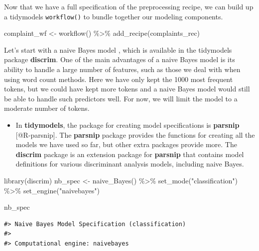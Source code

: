 \documentclass[
]{krantz}
\makeatletter
\newenvironment{Shaded}{\begin{snugshade}}{\end{snugshade}}
\newcommand{\FunctionTok}[1]{\textcolor[rgb]{0.00,0.00,0.00}{#1}}
\newcommand{\NormalTok}[1]{#1}
\newcommand{\OtherTok}[1]{\textcolor[rgb]{0.56,0.35,0.01}{#1}}
\newcommand{\SpecialCharTok}[1]{\textcolor[rgb]{0.00,0.00,0.00}{#1}}
\newcommand{\StringTok}[1]{\textcolor[rgb]{0.31,0.60,0.02}{#1}}
\newenvironment{kframe}{%
\medskip{}
\setlength{\fboxsep}{.8em}
 \def\at@end@of@kframe{}%
 \ifinner\ifhmode%
  \def\at@end@of@kframe{\end{minipage}}%
  \begin{minipage}{\columnwidth}%
 \fi\fi%
 \def\FrameCommand##1{\hskip\@totalleftmargin \hskip-\fboxsep
 \colorbox{shadecolor}{##1}\hskip-\fboxsep
     \hskip-\linewidth \hskip-\@totalleftmargin \hskip\columnwidth}%
 \MakeFramed {\advance\hsize-\width
   \@totalleftmargin\z@ \linewidth\hsize
   \@setminipage}}%
 {\par\unskip\endMakeFramed%
 \at@end@of@kframe}
\renewenvironment{Shaded}{\begin{kframe}}{\end{kframe}}
\newenvironment{rmdblock}[1]
  {\begin{shaded*}
  \begin{itemize}[left = -1cm, labelsep = 1cm]
  \renewcommand{\labelitemi}{
    \raisebox{-.7\height}[0pt][0pt]{
      {\setkeys{Gin}{width=3em,keepaspectratio}\texttt{[image: images/\#1]}}
    }
  }
 
  \item
  }
  {
  \end{itemize}
  \end{shaded*}
  }
\newenvironment{rmdpackage}
  {\begin{rmdblock}{package}}
  {\end{rmdblock}}
\makeatother
\begin{document}
Now that we have a full specification of the preprocessing recipe, we can build up a tidymodels \texttt{workflow()} to bundle together our modeling components.

\begin{Shaded}
\begin{Highlighting}[]
\NormalTok{complaint\_wf }\OtherTok{\textless{}{-}} \FunctionTok{workflow}\NormalTok{() }\SpecialCharTok{\%\textgreater{}\%}
  \FunctionTok{add\_recipe}\NormalTok{(complaints\_rec)}
\end{Highlighting}
\end{Shaded}

Let's start with a naive Bayes model \citep{kim2006, Kibriya2005, Eibe2006}, which is available in the tidymodels package \textbf{discrim}.
One of the main advantages of a naive Bayes model is its ability to handle a large number of features, such as those we deal with when using word count methods.
Here we have only kept the 1000 most frequent tokens, but we could have kept more tokens and a naive Bayes model would still be able to handle such predictors well. For now, we will limit the model to a moderate number of tokens.

\begin{rmdpackage}
In \textbf{tidymodels}, the package for creating model specifications is
\textbf{parsnip} {[}@R-parsnip{]}. The \textbf{parsnip} package provides
the functions for creating all the models we have used so far, but other
extra packages provide more. The \textbf{discrim} package is an
extension package for \textbf{parsnip} that contains model definitions
for various discriminant analysis models, including naive Bayes.
\end{rmdpackage}

\begin{Shaded}
\begin{Highlighting}[]
\FunctionTok{library}\NormalTok{(discrim)}
\NormalTok{nb\_spec }\OtherTok{\textless{}{-}} \FunctionTok{naive\_Bayes}\NormalTok{() }\SpecialCharTok{\%\textgreater{}\%}
  \FunctionTok{set\_mode}\NormalTok{(}\StringTok{"classification"}\NormalTok{) }\SpecialCharTok{\%\textgreater{}\%}
  \FunctionTok{set\_engine}\NormalTok{(}\StringTok{"naivebayes"}\NormalTok{)}

\NormalTok{nb\_spec}
\end{Highlighting}
\end{Shaded}

\begin{verbatim}
#> Naive Bayes Model Specification (classification)
#> 
#> Computational engine: naivebayes
\end{verbatim}
\end{document}

